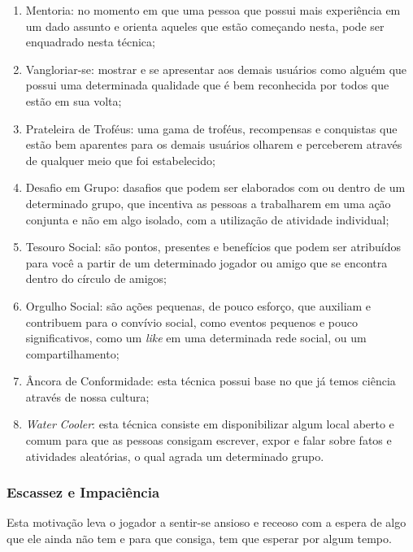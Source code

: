 \begin{enumerate}
    \item Mentoria: no momento em que uma pessoa que possui mais experiência
        em um dado assunto e orienta aqueles que estão começando nesta, pode
        ser enquadrado nesta técnica;
    \item Vangloriar-se: mostrar e se apresentar aos demais usuários como
        alguém que possui uma determinada qualidade que é bem reconhecida
        por todos que estão em sua volta;
    \item Prateleira de Troféus: uma gama de troféus, recompensas e conquistas
        que estão bem aparentes para os demais usuários olharem e perceberem
        através de qualquer meio que foi estabelecido;
    \item Desafio em Grupo: dasafios que podem ser elaborados com ou dentro
        de um determinado grupo, que incentiva as pessoas a trabalharem
        em uma ação conjunta e não em algo isolado, com a utilização de atividade
        individual;
    \item Tesouro Social: são pontos, presentes e benefícios que podem ser atribuídos
        para você a partir de um determinado jogador ou amigo que se encontra dentro
        do círculo de amigos;
    \item Orgulho Social:  são ações pequenas, de pouco esforço, que auxiliam e contribuem
        para o convívio social, como eventos pequenos e pouco significativos,
        como um \textit{like} em uma determinada rede social, ou um compartilhamento;
    \item Âncora de Conformidade: esta técnica possui base no que já temos ciência
        através de nossa cultura;
    \item \textit{Water} \textit{Cooler}: esta técnica consiste em disponibilizar algum local
        aberto e comum para que as pessoas consigam escrever, expor e falar
        sobre fatos e atividades aleatórias, o qual agrada um determinado grupo.

\end{enumerate}

\subsubsection{Escassez e Impaciência}
\label{sub:escassexeimpaciencia}
Esta motivação leva o jogador a sentir-se ansioso e receoso com a espera de algo
que ele ainda não tem e para que consiga, tem que esperar por algum tempo.

